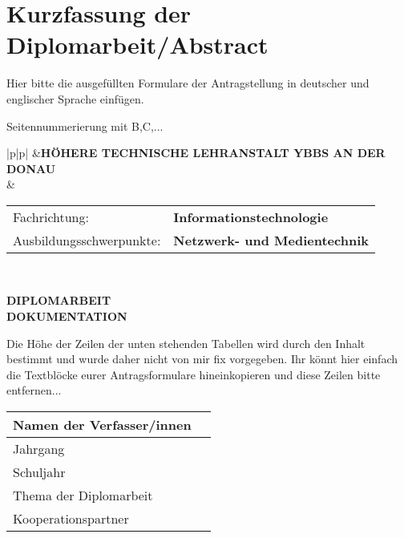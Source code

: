 \chapter*{Kurzfassung der Diplomarbeit/Abstract} 

Hier bitte die ausgefüllten Formulare der Antragstellung in deutscher und englischer Sprache einfügen.

Seitennummerierung mit B,C,...

\clearpage

\newlength{\htllogobreite}
\newlength{\beschriftungsbreite}
\newlength{\feldA}
\newlength{\feldB}

\begin{tabular}{|p{\htllogobreite}|p{\beschriftungsbreite}|}
\hline
{}&{\vspace{0.05em}\textbf{HÖHERE TECHNISCHE LEHRANSTALT YBBS AN DER DONAU}}\\[1.05em]
 & { \begin{tabular}{p{\feldA} p{\feldB}}
    Fachrichtung:&\textbf{Informationstechnologie}\\
    Ausbildungsschwerpunkte:&\textbf{Netzwerk- und Medientechnik}\\
   \end{tabular}
   }\\
\hline
\end{tabular}

\begin{center}
 \LARGE \textbf{DIPLOMARBEIT}\\
 \Large \textbf{DOKUMENTATION}\\
 \normalsize
\end{center}

Die Höhe der Zeilen der unten stehenden Tabellen wird durch den Inhalt bestimmt und wurde daher nicht von mir fix vorgegeben.
Ihr könnt hier einfach die Textblöcke eurer Antragsformulare hineinkopieren und diese Zeilen bitte entfernen...

\newlength{\feldC}
\newlength{\feldD}

\linespread{1.1} \normalsize
\begin{tabular}{|p{\feldC}|p{\feldD}|}
 \hline
 Namen der Verfasser/innen & \\
 \hline
 Jahrgang & \\ Schuljahr & \\
 \hline
 Thema der Diplomarbeit & \\
 \hline
 Kooperationspartner & \\
 \hline
\end{tabular}

